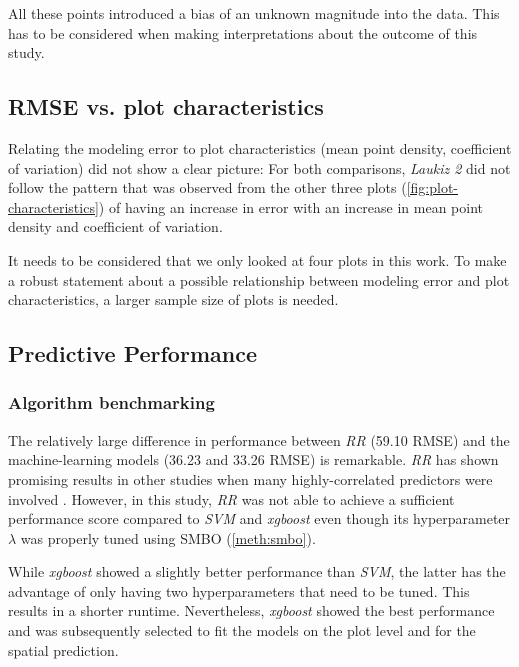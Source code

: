 \documentclass[review]{elsarticle}
\begin{document}
All these points introduced a bias of an unknown magnitude into the data.
This has to be considered when making interpretations about the outcome of this study.

\subsection{RMSE vs. plot characteristics}

\noindent Relating the modeling error to plot characteristics (mean point density, coefficient of variation) did not show a clear picture: For both comparisons, \textit{Laukiz 2} did not follow the pattern that was observed from the other three plots (\autoref{fig:plot-characteristics}) of having an increase in error with an increase in mean point density and coefficient of variation.

It needs to be considered that we only looked at four plots in this work.
To make a robust statement about a possible relationship between modeling error and plot characteristics, a larger sample size of plots is needed. 

\subsection{Predictive Performance}

\subsubsection{Algorithm benchmarking}

\noindent The relatively large difference in performance between \textit{RR} (59.10 RMSE) and the machine-learning models (36.23 and 33.26 RMSE) is remarkable.
\textit{RR} has shown promising results in other studies when many highly-correlated predictors were involved \citep{hernandezUsingRidgeRegression2015, imaniRidgeRegressionbasedFeature2015}.
However, in this study, \textit{RR} was not able to achieve a sufficient performance score compared to \textit{SVM} and \textit{xgboost} even though its hyperparameter $\lambda$ was properly tuned using SMBO (\autoref{meth:smbo}).

While \textit{xgboost} showed a slightly better performance than \textit{SVM}, the latter has the advantage of only having two hyperparameters that need to be tuned.
This results in a shorter runtime.
Nevertheless, \textit{xgboost} showed the best performance and was subsequently selected to fit the models on the plot level and for the spatial prediction.
\end{document}
